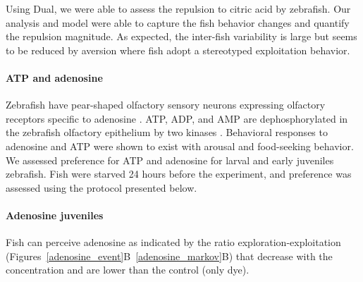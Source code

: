   Using Dual, we were able to assess the repulsion to citric acid by zebrafish. Our analysis and model were able to capture the fish behavior changes and quantify the repulsion magnitude. As expected, the inter-fish variability is large but seems to be reduced by aversion where fish adopt a stereotyped exploitation behavior.

  \paragraph{ATP and adenosine}
  Zebrafish have pear-shaped olfactory sensory neurons expressing olfactory receptors specific to adenosine \cite{wakisaka2017adenosine}. ATP, ADP, and AMP are dephosphorylated in the zebrafish olfactory epithelium by two kinases \cite{wakisaka2017adenosine}. Behavioral responses to adenosine and ATP were shown to exist with arousal and food-seeking behavior. We assessed preference for ATP and adenosine for larval and early juveniles zebrafish. Fish were starved 24 hours before the experiment, and preference was assessed using the protocol presented below.

  \paragraph{Adenosine juveniles} Fish can perceive adenosine as indicated by the ratio exploration-exploitation (Figures~\ref{adenosine_event}B~\ref{adenosine_markov}B) that decrease with the concentration and are lower than the control (only dye).


